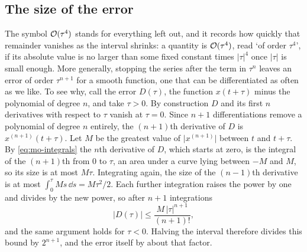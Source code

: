 \subsection*{The size of the error}

The symbol $\mathcal{O}(\tau^4)$ stands for everything left out, and it
records how quickly that remainder vanishes as the interval shrinks: a
quantity is $\mathcal{O}(\tau^4)$, read `of order $\tau^4$', if its absolute
value is no larger than some fixed constant times $\lvert\tau\rvert^4$
once $\lvert\tau\rvert$ is small enough. More generally, stopping the
series after the term in $\tau^n$ leaves an error of order $\tau^{n+1}$
for a smooth function, one that can be differentiated as often as we
like. To see why, call the error $D(\tau)$, the function $x(t+\tau)$
minus the polynomial of degree $n$, and take $\tau > 0$. By construction
$D$ and its first $n$ derivatives with respect to $\tau$ vanish at $\tau
= 0$. Since $n + 1$ differentiations remove a polynomial of degree $n$
entirely, the $(n+1)$th derivative of $D$ is $x^{(n+1)}(t+\tau)$. Let $M$
be the greatest value of $\lvert x^{(n+1)}\rvert$ between $t$ and $t +
\tau$. By \cref{eq:mo-integrals} the $n$th derivative of $D$, which
starts at zero, is the integral of the $(n+1)$th from 0 to $\tau$, an
area under a curve lying between $-M$ and $M$, so its size is at most
$M\tau$. Integrating again, the size of the $(n-1)$th derivative is at
most $\int_0^\tau M s\,\dd s = M\tau^2/2$. Each further integration raises
the power by one and divides by the new power, so after $n + 1$
integrations
\begin{equation*}
   \lvert D(\tau)\rvert \le \frac{M\,\lvert\tau\rvert^{n+1}}{(n+1)!} ,
\end{equation*}
and the same argument holds for $\tau < 0$. Halving the interval
therefore divides this bound by $2^{n+1}$, and the error itself by about
that factor.

